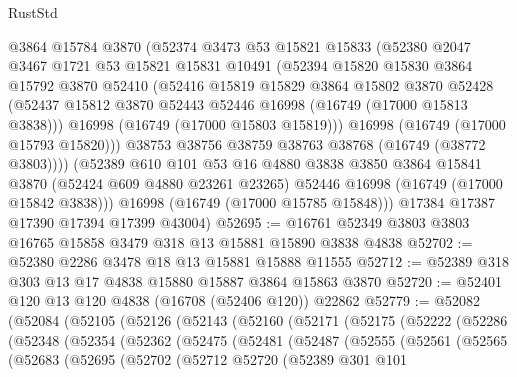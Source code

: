 \begin{lexlean}{RustStd}
\begin{coremodule}
        @3864
        @15784
        @3870
        (@52374
          @3473
          @53
          @15821
          @15833
          (@52380
            @2047
            @3467
            @1721
            @53
            @15821
            @15831
            @10491
            (@52394
              @15820
              @15830
              @3864
              @15792
              @3870
              @52410
              (@52416
                @15819
                @15829
                @3864
                @15802
                @3870
                @52428
                (@52437 @15812 @3870 @52443 @52446 @16998 (@16749 (@17000 @15813 @3838)))
                @16998
                (@16749 (@17000 @15803 @15819)))
              @16998
              (@16749 (@17000 @15793 @15820)))
            @38753
            @38756
            @38759
            @38763
            @38768
            (@16749 (@38772 @3803))))
        (@52389
          @610
          @101
          @53
          @16
          @4880
          @3838
          @3850
          @3864
          @15841
          @3870
          (@52424 @609 @4880 @23261 @23265)
          @52446
          @16998
          (@16749 (@17000 @15842 @3838)))
        @16998
        (@16749 (@17000 @15785 @15848)))
      @17384
      @17387
      @17390
      @17394
      @17399
      @43004)
@52695 := @16761 @52349 @3803 @3803 @16765 @15858 @3479 @318 @13 @15881 @15890 @3838 @4838
@52702 := @52380 @2286 @3478 @18 @13 @15881 @15888 @11555
@52712 := @52389 @318 @303 @13 @17 @4838 @15880 @15887 @3864 @15863 @3870
@52720 := @52401 @120 @13 @120 @4838 (@16708 (@52406 @120)) @22862
@52779 := @52082
    (@52084
      (@52105
        (@52126
          (@52143
            (@52160
              (@52171
                (@52175
                  (@52222
                    (@52286
                      (@52348
                        (@52354
                          (@52362
                            (@52475
                              (@52481
                                (@52487
                                  (@52555
                                    (@52561
                                      (@52565
                                        (@52683
                                          (@52695
                                            (@52702
                                              (@52712
                                                @52720
                                                (@52389
                                                  @301
                                                  @101

\end{coremodule}
\end{lexlean}

